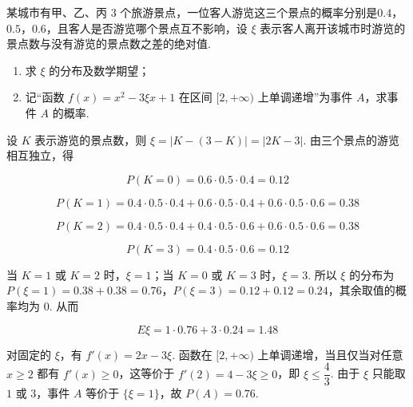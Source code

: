 \begin{problem}
某城市有甲、乙、丙 \(3\) 个旅游景点，一位客人游览这三个景点的概率分别是\(0.4\)，\(0.5\)，\(0.6\)，且客人是否游览哪个景点互不影响，设 \(\xi\) 表示客人离开该城市时游览的景点数与没有游览的景点数之差的绝对值.

\begin{enumerate}
\item 求 \(\xi\) 的分布及数学期望；
        \item 记“函数 \(f(x)=x^{2}-3\xi x+1\) 在区间 \([2,+\infty)\) 上单调递增”为事件 \(A\)，求事件 \(A\) 的概率.
\end{enumerate}

\begin{solution}
设 \(K\) 表示游览的景点数，则 \(\xi=\lvert K-(3-K)\rvert=\lvert2K-3\rvert\). 由三个景点的游览相互独立，得

\[
P(K=0)=0.6\cdot0.5\cdot0.4=0.12
\]

\[
P(K=1)=0.4\cdot0.5\cdot0.4+0.6\cdot0.5\cdot0.4+0.6\cdot0.5\cdot0.6=0.38
\]

\[
P(K=2)=0.4\cdot0.5\cdot0.4+0.4\cdot0.5\cdot0.6+0.6\cdot0.5\cdot0.6=0.38
\]

\[
P(K=3)=0.4\cdot0.5\cdot0.6=0.12
\]

当 \(K=1\) 或 \(K=2\) 时，\(\xi=1\)；当 \(K=0\) 或 \(K=3\) 时，\(\xi=3\). 所以 \(\xi\) 的分布为 \(P(\xi=1)=0.38+0.38=0.76\)，\(P(\xi=3)=0.12+0.12=0.24\)，其余取值的概率均为 \(0\). 从而

\[
E\xi=1\cdot0.76+3\cdot0.24=1.48
\]

对固定的 \(\xi\)，有 \(f'(x)=2x-3\xi\). 函数在 \([2,+\infty)\) 上单调递增，当且仅当对任意 \(x\geqslant2\) 都有 \(f'(x)\geqslant0\)，这等价于 \(f'(2)=4-3\xi\geqslant0\)，即 \(\xi\leqslant\dfrac{4}{3}\). 由于 \(\xi\) 只能取 \(1\) 或 \(3\)，事件 \(A\) 等价于 \(\{\xi=1\}\)，故 \(P(A)=0.76\).
\end{solution}
\end{problem}


